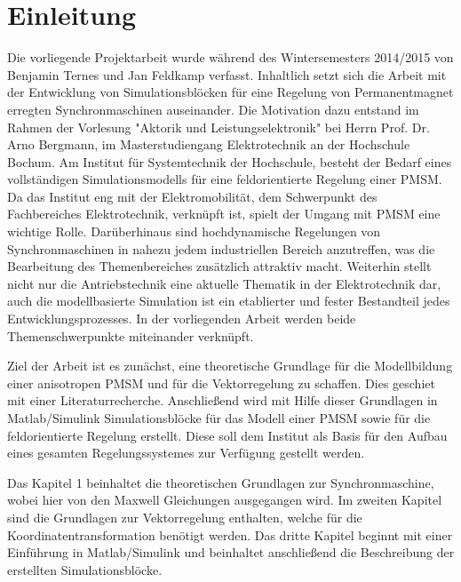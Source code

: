 
\chapter{Einleitung}
\label{cha:einleitung}

Die vorliegende Projektarbeit wurde während des Wintersemesters 2014/2015 von Benjamin Ternes und Jan Feldkamp verfasst.
Inhaltlich setzt sich die Arbeit mit der Entwicklung von Simulationsblöcken für eine Regelung von Permanentmagnet erregten Synchronmaschinen auseinander.
Die Motivation dazu entstand im Rahmen der Vorlesung "Aktorik und Leistungselektronik" bei Herrn Prof. Dr. Arno Bergmann, im Masterstudiengang Elektrotechnik an der Hochschule Bochum.
Am Institut für Systemtechnik der Hochschule, besteht der Bedarf eines vollständigen Simulationsmodells für eine feldorientierte Regelung einer PMSM.
Da das Institut eng mit der Elektromobilität, dem Schwerpunkt des Fachbereiches Elektrotechnik, verknüpft ist, spielt der Umgang mit PMSM eine wichtige Rolle.
Darüberhinaus sind hochdynamische Regelungen von Synchronmaschinen in nahezu jedem industriellen Bereich anzutreffen, was die Bearbeitung des Themenbereiches zusätzlich attraktiv macht.
Weiterhin stellt nicht nur die Antriebstechnik eine aktuelle Thematik in der Elektrotechnik dar, auch die modellbasierte Simulation ist ein etablierter und fester Bestandteil jedes Entwicklungsprozesses.
In der vorliegenden Arbeit werden beide Themenschwerpunkte miteinander verknüpft.

Ziel der Arbeit ist es zunächst, eine theoretische Grundlage für die Modellbildung einer anisotropen PMSM und für die Vektorregelung zu schaffen.
Dies geschiet mit einer Literaturrecherche.
Anschließend wird mit Hilfe dieser Grundlagen in Matlab/Simulink Simulationsblöcke für das Modell einer PMSM sowie für die feldorientierte Regelung erstellt.
Diese soll dem Institut als Basis für den Aufbau eines gesamten Regelungssystemes zur Verfügung gestellt werden.

Das Kapitel 1 beinhaltet die theoretischen Grundlagen zur Synchronmaschine, wobei hier von den Maxwell Gleichungen ausgegangen wird.
Im zweiten Kapitel sind die Grundlagen zur Vektorregelung enthalten, welche für die Koordinatentransformation benötigt werden.
Das dritte Kapitel beginnt mit einer Einführung in Matlab/Simulink und beinhaltet anschließend die Beschreibung der erstellten Simulationsblöcke.


 

\cleardoublepage
